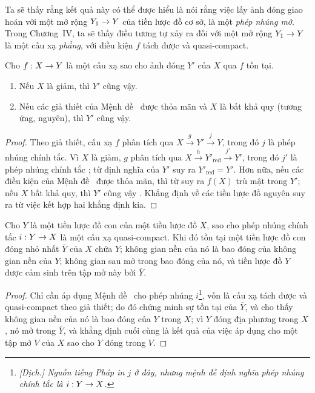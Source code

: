 \documentclass[oneside]{amsart}
\makeatletter
\newcommand{\ega@arrow}[2]{\mathchoice{#1}{#2}{#2}{#2}}
\renewcommand{\to}{\ega@arrow{\longrightarrow}{\rightarrow}}
\let\EGAOriginalLabel\label
\renewcommand{\label}[1]{\phantomsection\EGAOriginalLabel{#1}}
\makeatother
\begin{document}
Ta sẽ thấy rằng kết quả này có thể được hiểu là nói rằng việc lấy ảnh đóng giao hoán với một mở rộng $Y_1\to Y$ của tiền lược đồ cơ sở, là một \emph{phép nhúng mở}.
Trong Chương~IV, ta sẽ thấy điều tương tự xảy ra đối với một mở rộng $Y_1\to Y$ là một cấu xạ \emph{phẳng}, với điều kiện $f$ tách được và quasi-compact.

\begin{proposition}[9.5.9]
\label{I.9.5.9}
Cho $f:X\to Y$ là một cấu xạ sao cho ảnh đóng $Y'$ của $X$ qua $f$ tồn tại.
\begin{enumerate}
  \item[{\rm(i)}] Nếu $X$ là giảm, thì $Y'$ cũng vậy.
  \item[{\rm(ii)}] Nếu các giả thiết của Mệnh đề~ được thỏa mãn và $X$ là bất khả quy (tương ứng, nguyên), thì $Y'$ cũng vậy.
\end{enumerate}
\end{proposition}

\begin{proof}
Theo giả thiết, cấu xạ $f$ phân tích qua $X\xrightarrow{g}Y'\xrightarrow{j}Y$, trong đó $j$ là phép nhúng chính tắc.
Vì $X$ là giảm, $g$ phân tích qua $X\xrightarrow{h}Y'_{\mathrm{red}}\xrightarrow{j'}Y'$, trong đó $j'$ là phép nhúng chính tắc ; từ định nghĩa của $Y'$ suy ra $Y'_{\mathrm{red}}=Y'$.
Hơn nữa, nếu các điều kiện của Mệnh đề~ được thỏa mãn, thì từ  suy ra $f(X)$ trù mật trong $Y'$; nếu $X$ bất khả quy, thì $Y'$ cũng vậy .
Khẳng định về các tiền lược đồ nguyên suy ra từ việc kết hợp hai khẳng định kia.
\end{proof}

\begin{proposition}[9.5.10]
\label{I.9.5.10}
Cho $Y$ là một tiền lược đồ con của một tiền lược đồ $X$, sao cho phép nhúng chính tắc $i:Y\to X$ là một cấu xạ quasi-compact.
Khi đó tồn tại một tiền lược đồ con đóng nhỏ nhất $\overline{Y}$ của $X$ chứa $Y$; không gian nền của nó là bao đóng của không gian nền của $Y$; không gian sau mở trong bao đóng của nó, và tiền lược đồ $Y$ được cảm sinh trên tập mở này bởi $\overline{Y}$.
\end{proposition}

\begin{proof}
Chỉ cần áp dụng Mệnh đề~ cho phép nhúng $i$\footnote{\emph{[Dịch.] Nguồn tiếng Pháp in $j$ ở đây, nhưng mệnh đề định nghĩa phép nhúng chính tắc là $i:Y\to X$.}}, vốn là cấu xạ tách được  và quasi-compact theo giả thiết; do đó  chứng minh sự tồn tại của $\overline{Y}$, và  cho thấy không gian nền của nó là bao đóng của $Y$ trong $X$; vì $Y$ đóng địa phương trong $X$, nó mở trong $\overline{Y}$, và khẳng định cuối cùng là kết quả của việc áp dụng  cho một tập mở $V$ của $X$ sao cho $Y$ đóng trong $V$.
\end{proof}
\end{document}
